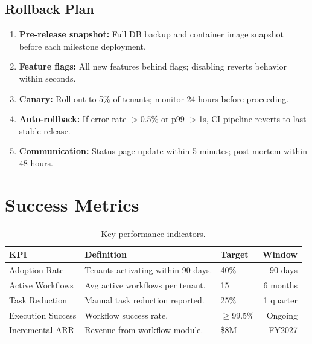 \documentclass[
    language=english,
    doctype=article,
    institution=none,
]{../../omnilatex}
\begin{document}
\subsection{Rollback Plan}

\begin{enumerate}
    \item \textbf{Pre-release snapshot:} Full DB backup and container image
          snapshot before each milestone deployment.
    \item \textbf{Feature flags:} All new features behind flags; disabling
          reverts behavior within seconds.
    \item \textbf{Canary:} Roll out to 5\% of tenants; monitor 24 hours
          before proceeding.
    \item \textbf{Auto-rollback:} If error rate $>$0.5\% or p99 $>$1s,
          CI pipeline reverts to last stable release.
    \item \textbf{Communication:} Status page update within 5 minutes;
          post-mortem within 48 hours.
\end{enumerate}

\section{Success Metrics}

\begin{tcolorbox}[colback=green!5!white, colframe=green!60!black,
    title={\sffamily\bfseries KPI Dashboard}, fonttitle=\sffamily\large,
    leftrule=4mm, arc=2mm, enhanced]
\begin{table}[htbp]
\centering\small
\begin{tabular}{@{}lllr@{}}
    \toprule
    \textbf{KPI} & \textbf{Definition} & \textbf{Target}
        & \textbf{Window} \\
    \midrule
    Adoption Rate     & Tenants activating within 90 days. & 40\%
        & 90 days \\
    Active Workflows  & Avg active workflows per tenant. & 15
        & 6 months \\
    Task Reduction    & Manual task reduction reported. & 25\%
        & 1 quarter \\
    Execution Success & Workflow success rate. & $\geq$99.5\%
        & Ongoing \\
    Incremental ARR   & Revenue from workflow module. & \$8M
        & FY2027 \\
    \bottomrule
\end{tabular}
\caption{Key performance indicators.}
\label{tab:kpi}
\end{table}
\end{tcolorbox}

\printbibliography[heading=none]
\end{document}
